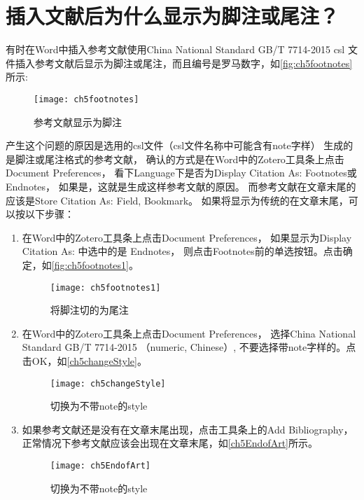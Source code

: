 \documentclass[cn,11pt,chinese]{elegantbook}
\begin{document}
		\section{插入文献后为什么显示为脚注或尾注？}\label{sec:footnotes}
			有时在Word中插入参考文献使用China National Standard GB/T 7714-2015 csl
			文件插入参考文献后显示为脚注或尾注，而且编号是罗马数字，如\autoref{fig:ch5footnotes}所示:
	    		    \begin{figure}[ht]
				    	\centering
				    	\texttt{[image: ch5footnotes]}
				    	\caption{参考文献显示为脚注}
				    	\label{fig:ch5footnotes}
	    			\end{figure}
				产生这个问题的原因是选用的csl文件（csl文件名称中可能含有note字样）
				生成的是脚注或尾注格式的参考文献，
				确认的方式是在Word中的Zotero工具条上点击Document Preferences，
				看下Language下是否为Display Citation As: Footnotes或Endnotes，
				如果是，这就是生成这样参考文献的原因。
				而参考文献在文章末尾的应该是Store Citation As: Field, Bookmark。 
				如果将显示为传统的在文章末尾，可以按以下步骤：
    			\begin{enumerate}
    				\item 
						 在Word中的Zotero工具条上点击Document Preferences，
						 如果显示为Display Citation As: 中选中的是 Endnotes，
						 则点击Footnotes前的单选按钮。点击确定，如\autoref{fig:ch5footnotes1}。
			    			 \begin{figure}[ht]
			    				\centering
			    				\texttt{[image: ch5footnotes1]}
			    				\caption{将脚注切的为尾注}
			    				\label{fig:ch5footnotes1}
			    			\end{figure}
		    			\item 
							在Word中的Zotero工具条上点击Document Preferences，
							选择China National Standard GB/T 7714-2015 （numeric, Chinese）,
							不要选择带note字样的。点击OK，如\autoref{ch5changeStyle}。
				    			 \begin{figure}[ht]
				    				\centering
				    				\texttt{[image: ch5changeStyle]}
				    				\caption{切换为不带note的style}
				    				\label{ch5changeStyle}
				    			\end{figure}
		    			\item 
							如果参考文献还是没有在文章末尾出现，点击工具条上的Add Bibliography，
							正常情况下参考文献应该会出现在文章末尾，如\autoref{ch5EndofArt}所示。
				    			\begin{figure}[ht]
				    				\centering
				    				\texttt{[image: ch5EndofArt]}
				    				\caption{切换为不带note的style}
				    				\label{ch5EndofArt}
				    			\end{figure}
			    			\end{enumerate}
	    			
\end{document}
